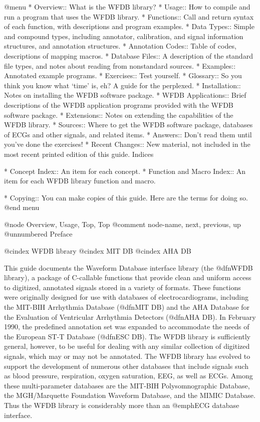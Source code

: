 @menu
* Overview::			What is the WFDB library?
* Usage::			How to compile and run a program that uses
				the WFDB library.
* Functions::			Call and return syntax of each function, with
				descriptions and program examples.
* Data Types::		        Simple and compound types, including annotator,
				calibration, and signal information structures,
				and annotation structures.
* Annotation Codes::    	Table of codes, descriptions of mapping macros.
* Database Files::		A description of the standard file types, and
				notes about reading from nonstandard sources.
* Examples::			Annotated example programs.
* Exercises::			Test yourself.
* Glossary::			So you think you know what `time' is, eh?
				A guide for the perplexed.
* Installation::		Notes on installing the WFDB software package.
* WFDB Applications::		Brief descriptions of the WFDB application
				programs provided with the WFDB software package.
* Extensions::			Notes on extending the capabilities of the
				WFDB library.
* Sources::			Where to get the WFDB software package, databases
				of ECGs and other signals, and related items.
* Answers::                     Don't read them until you've done the exercises!
* Recent Changes::              New material, not included in the most
                                recent printed edition of this guide.
Indices

* Concept Index::		An item for each concept.
* Function and Macro Index::	An item for each WFDB library function and macro.

* Copying::                     You can make copies of this guide.  Here are
                                the terms for doing so.
@end menu

@node     Overview, Usage, Top, Top
@comment  node-name,  next,  previous,  up
@unnumbered Preface

@cindex WFDB library
@cindex MIT DB
@cindex AHA DB

This guide documents the Waveform Database interface library (the
@dfn{WFDB library}), a package of C-callable functions that provide
clean and uniform access to digitized, annotated signals stored in a
variety of formats.  These functions were originally designed for use
with databases of electrocardiograms, including the MIT-BIH Arrhythmia
Database (@dfn{MIT DB}) and the AHA Database for the Evaluation of
Ventricular Arrhythmia Detectors (@dfn{AHA DB}).  In February 1990, the
predefined annotation set was expanded to accommodate the needs of the
European ST-T Database (@dfn{ESC DB}).  The WFDB library is sufficiently
general, however, to be useful for dealing with any similar collection
of digitized signals, which may or may not be annotated.  The WFDB
library has evolved to support the development of numerous other
databases that include signals such as blood pressure, respiration,
oxygen saturation, EEG, as well as ECGs.  Among these multi-parameter
databases are the MIT-BIH Polysomnographic Database, the MGH/Marquette
Foundation Waveform Database, and the MIMIC Database.  Thus the WFDB
library is considerably more than an @emph{ECG} database interface.

